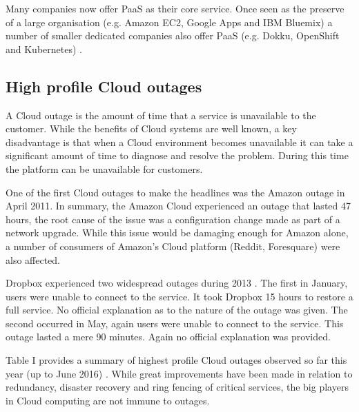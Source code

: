 \documentclass[5p]{elsarticle}
\begin{document}
Many companies now offer PaaS as their core service. Once seen as the preserve of a large organisation (e.g. Amazon EC2, Google Apps and IBM Bluemix) a number of smaller dedicated companies also offer PaaS (e.g. Dokku, OpenShift and Kubernetes) \cite{Paas2016}.


\subsection{High profile Cloud outages}
A Cloud outage is the amount of time that a service is unavailable to the customer. While the benefits of Cloud systems are well known, a key disadvantage is that when a Cloud environment becomes unavailable it can take a significant amount of time to diagnose and resolve the problem. During this time the platform can be unavailable for customers.

One of the first Cloud outages to make the headlines was the Amazon outage in April 2011. In summary, the Amazon Cloud experienced an outage that lasted 47 hours, the root cause of the issue was a configuration change made as part of a network upgrade. While this issue would be damaging enough for Amazon alone, a number of consumers of Amazon's Cloud platform (Reddit, Foresquare) were also affected. \cite{InfoWorld2015outage} 

Dropbox experienced two widespread outages during 2013 \cite{Talbot013DBoutage, Etherington2013DBoutage}. The first in January, users were unable to connect to the service. It took Dropbox 15 hours to restore a full service. No official explanation as to the nature of the outage was given. The second occurred in May, again users were unable to connect to the service. This outage lasted a mere 90 minutes. Again no official explanation was provided.

Table I provides a summary of highest profile Cloud outages observed so far this year (up to June 2016)\cite{CRN2016outage} . While great improvements have been made in relation to redundancy, disaster recovery and ring fencing of critical services, the big players in Cloud computing are not immune to outages.
\end{document}
